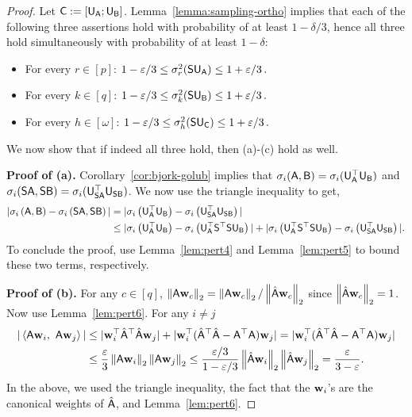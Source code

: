 \begin{proof}
Let $\matC :=  [\matU_{\matA} ; \matU_{\matB}]$. Lemma~\ref{lemma:sampling-ortho} implies that each of the following three assertions hold with probability of at least $1-\delta/3$, hence all three hold simultaneously with probability of at least $1-\delta$:
\begin{itemize}
\item For every $r\in[p]$: $1-\eps/3 \le \sigma_r^2(\matS \matU_{\matA}) \le  1+\eps/3\,.$
\item For every $k\in[q]$: $1-\eps/3 \le \sigma_k^2(\matS \matU_{\matB}) \le  1+\eps/3\,.$
\item For every $h\in[\omega]$: $1-\eps/3 \le \sigma_h^2(\matS \matU_{\matC}) \le  1+\eps/3\,.$
\end{itemize}
We now show that if indeed all three hold, then (a)-(c) hold as well.

{\bf Proof of (a).} Corollary~\ref{cor:bjork-golub} implies that
$\sigma_i(\matA, \matB) = \sigma_i(\matU^\top_\matA \matU_\matB)$ and
$\sigma_i(\matS \matA, \matS \matB) = \sigma_i(\matU^\top_{\matS \matA} \matU_{\matS \matB})$.
We now use the triangle inequality to get,
\begin{align*}
| \sigma_i \left( \matA, \matB \right) -  \sigma_i \left(\matS \matA, \matS\matB \right) |
    & =   | \sigma_i \left( \matU_{\matA}^\top\matU_{\matB} \right) -   \sigma_i \left( \matU_{\matS\matA}^\top\matU_{\matS\matB} \right) |  \\
    & \leq   | \sigma_i \left( \matU_{\matA}^\top\matU_{\matB} \right)  - \sigma_i\left( \matU_{\matA}^\top \matS^\top \matS \matU_{\matB} \right)|
 	   +    |\sigma_i\left( \matU_{\matA}^\top \matS^\top \matS \matU_{\matB} \right) -   \sigma_i \left( \matU_{\matS\matA}^\top\matU_{\matS\matB} \right) |.
\end{align*}
To conclude the proof, use Lemma~\ref{lem:pert4} and Lemma~\ref{lem:pert5} to bound these two terms, respectively.

{\bf Proof of (b).} For any $c \in [q]$, $\norm{\matA \w_c} = \norm{\matA \w_c} / \norm{\hat{\matA} \w_c}$ since $\norm{\hat{\matA} \w_c} = 1$. Now use Lemma~\ref{lem:pert6}. For any $i\neq j$
\begin{align*}
	|\ip{\matA \w_i}{ \matA \w_j }| & \leq  |\w_i^\top \hat{\matA}^\top \hat{\matA}  \w_j|
	   +   |\w_i^\top (\hat{\matA}^\top \hat{\matA} - \matA^\top \matA)\w_j|
       =   |\w_i^\top (\hat{\matA}^\top \hat{\matA} - \matA^\top \matA)\w_j| \\
	& \leq  \frac{\eps}{3} \norm{\matA \w_i} \norm{\matA \w_j}
	 \leq  \frac{\eps/3}{1-\eps/3} \norm{\hat{\matA}\w_i}\norm{\hat{\matA}\w_j}
	   =   \frac{\eps}{3-\eps}.
\end{align*}
In the above, we used the triangle inequality, the fact that the $\w_i$'s are the canonical weights of $\hat{\matA}$, and Lemma~\ref{lem:pert6}.


\end{proof}
